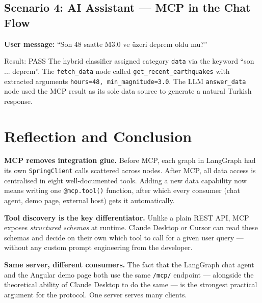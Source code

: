 \documentclass[11pt,a4paper]{article}
\begin{document}
\subsection{Scenario 4: AI Assistant --- MCP in the Chat Flow}

\textbf{User message:} ``Son 48 saatte M3.0 ve üzeri deprem oldu mu?''

\begin{successbox}{Result: PASS}
The hybrid classifier assigned category \texttt{data} via the keyword
``son ... deprem''. The \texttt{fetch\_data} node called
\texttt{get\_recent\_earthquakes} with extracted arguments
\texttt{hours=48, min\_magnitude=3.0}. The LLM \texttt{answer\_data} node used
the MCP result as its sole data source to generate a natural Turkish response.
\end{successbox}

\section{Reflection and Conclusion}

\begin{reflectionbox}
\textbf{MCP removes integration glue.} Before MCP, each graph in LangGraph had its
own \texttt{SpringClient} calls scattered across nodes. After MCP, all data access
is centralised in eight well-documented tools. Adding a new data capability now
means writing one \texttt{@mcp.tool()} function, after which every consumer
(chat agent, demo page, external host) gets it automatically.
\end{reflectionbox}

\begin{reflectionbox}
\textbf{Tool discovery is the key differentiator.} Unlike a plain REST API, MCP
exposes \textit{structured schemas} at runtime. Claude Desktop or Cursor can read
these schemas and decide on their own which tool to call for a given user query ---
without any custom prompt engineering from the developer.
\end{reflectionbox}

\begin{reflectionbox}
\textbf{Same server, different consumers.} The fact that the LangGraph chat agent
and the Angular demo page both use the same \texttt{/mcp/} endpoint --- alongside
the theoretical ability of Claude Desktop to do the same --- is the strongest
practical argument for the protocol. One server serves many clients.
\end{reflectionbox}
\end{document}
